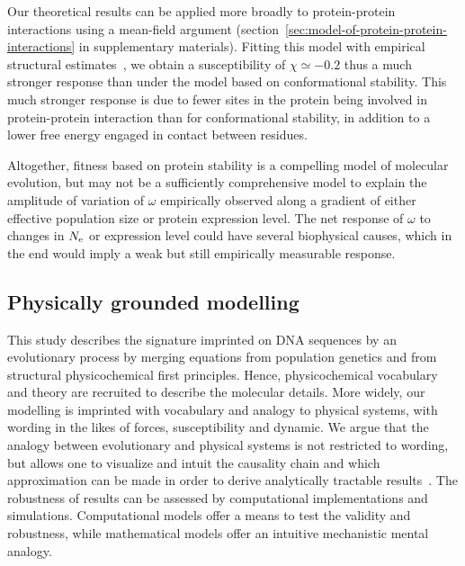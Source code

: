 Our theoretical results can be applied more broadly to protein-protein interactions using a mean-field argument (section~\ref{sec:model-of-protein-protein-interactions} in supplementary materials).
Fitting this model with empirical structural estimates~\citep{Janin1995a, Zhang2008}, we obtain a susceptibility of $\chi \simeq -0.2$ thus a much stronger response than under the model based on conformational stability.
This much stronger response is due to fewer sites in the protein being involved in protein-protein interaction than for conformational stability, in addition to a lower free energy engaged in contact between residues.

Altogether, fitness based on protein stability is a compelling model of molecular evolution, but may not be a sufficiently comprehensive model to explain the amplitude of variation of $\omega$ empirically observed along a gradient of either effective population size or protein expression level.
The net response of $\omega$ to changes in $N_{\text{e}}$ or expression level could have several biophysical causes, which in the end would imply a weak but still empirically measurable response.

\subsection{Physically grounded modelling}
This study describes the signature imprinted on \acrshort{DNA} sequences by an evolutionary process by merging equations from population genetics and from structural physicochemical first principles.
Hence, physicochemical vocabulary and theory are recruited to describe the molecular details.
More widely, our modelling is imprinted with vocabulary and analogy to physical systems, with wording in the likes of forces, susceptibility and dynamic.
We argue that the analogy between evolutionary and physical systems is not restricted to wording, but allows one to visualize and intuit the causality chain and which approximation can be made in order to derive analytically tractable results~\citep{Sella2005, Mustonen2009, Bastolla2012, Bastolla2017}.
The robustness of results can be assessed by computational implementations and simulations.
Computational models offer a means to test the validity and robustness, while mathematical models offer an intuitive mechanistic mental analogy.

